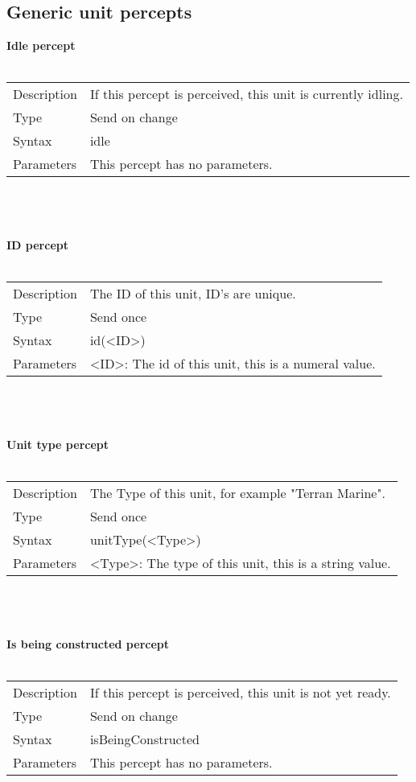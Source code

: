 \documentclass[english,11pt]{report}
\begin{document}
\subsection{Generic unit percepts}
\textbf{Idle percept}\\
\\
\begin{tabularx}{\textwidth}{lX}
 Description & If this percept is perceived, this unit is currently idling. \\
 Type & Send on change \\
 Syntax & idle \\
 Parameters &   This percept has no parameters.
\end{tabularx}\\
\\
\\
\textbf{ID percept}\\
\\
\begin{tabularx}{\textwidth}{lX}
 Description & The ID of this unit, ID's are unique. \\
 Type & Send once \\
 Syntax & id(<ID>) \\
 Parameters &   <ID>: The id of this unit, this is a numeral value.
\end{tabularx}\\
\\
\\
\textbf{Unit type percept}\\
\\
\begin{tabularx}{\textwidth}{lX}
 Description & The Type of this unit, for example "Terran Marine". \\
 Type & Send once \\
 Syntax & unitType(<Type>) \\
 Parameters &   <Type>: The type of this unit, this is a string value.
\end{tabularx}\\
\\
\\
\textbf{Is being constructed percept}\\
\\
\begin{tabularx}{\textwidth}{lX}
 Description & If this percept is perceived, this unit is not yet ready. \\
 Type & Send on change \\
 Syntax & isBeingConstructed \\
 Parameters &   This percept has no parameters.
\end{tabularx}\\
\end{document}

